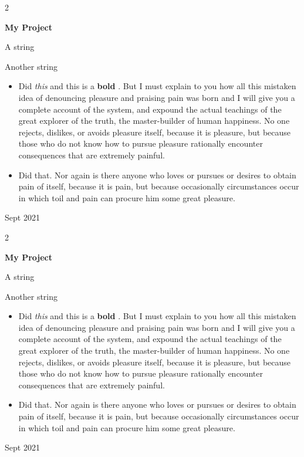 \documentclass[10pt, letterpaper]{article}
\newenvironment{summary}{
    \begin{description}[
        topsep=0.10 cm,
        parsep=0.10 cm,
        partopsep=0pt,
        itemsep=0pt,
        leftmargin=0.4 cm + 10pt
    ]
}{
    \end{description}
} %
\newenvironment{highlights}{
    \begin{itemize}[
        topsep=0.10 cm,
        parsep=0.10 cm,
        partopsep=0pt,
        itemsep=0pt,
        leftmargin=0.4 cm + 10pt
    ]
}{
    \end{itemize}
} %
\newenvironment{twocolentry}[2][]{
    \onecolentry
    \def\secondColumn{#2}
    \setcolumnwidth{\fill, 4.5 cm}
    \begin{paracol}{2}
}{
    \switchcolumn \raggedleft \secondColumn
    \end{paracol}
    \endonecolentry
} %
\let\hrefWithoutArrow\href
\renewcommand{\href}[2]{\hrefWithoutArrow{#1}{\ifthenelse{\equal{#2}{}}{ }{#2 }\raisebox{.15ex}{\footnotesize \faExternalLink*}}}
\begin{document}
        \begin{twocolentry}{
            Sept 2021
        }
            \textbf{My Project}
            \begin{summary}
                \item A string
                \item Another string
            \end{summary}
            \begin{highlights}
                \item Did \textit{this} and this is a \textbf{bold} \href{https://example.com}{link}. But I must explain to you how all this mistaken idea of denouncing pleasure and praising pain was born and I will give you a complete account of the system, and expound the actual teachings of the great explorer of the truth, the master-builder of human happiness. No one rejects, dislikes, or avoids pleasure itself, because it is pleasure, but because those who do not know how to pursue pleasure rationally encounter consequences that are extremely painful.
                \item Did that. Nor again is there anyone who loves or pursues or desires to obtain pain of itself, because it is pain, but because occasionally circumstances occur in which toil and pain can procure him some great pleasure.
            \end{highlights}
        \end{twocolentry}


        \vspace{0.2 cm}

        \begin{twocolentry}{
            Sept 2021
        }
            \textbf{My Project}
            \begin{summary}
                \item A string
                \item Another string
            \end{summary}
            \begin{highlights}
                \item Did \textit{this} and this is a \textbf{bold} \href{https://example.com}{link}. But I must explain to you how all this mistaken idea of denouncing pleasure and praising pain was born and I will give you a complete account of the system, and expound the actual teachings of the great explorer of the truth, the master-builder of human happiness. No one rejects, dislikes, or avoids pleasure itself, because it is pleasure, but because those who do not know how to pursue pleasure rationally encounter consequences that are extremely painful.
                \item Did that. Nor again is there anyone who loves or pursues or desires to obtain pain of itself, because it is pain, but because occasionally circumstances occur in which toil and pain can procure him some great pleasure.
            \end{highlights}
        \end{twocolentry}
\end{document}
